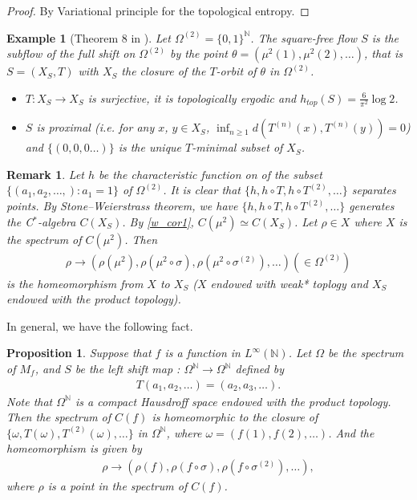 \documentclass[a4paper,10pt]{amsart}
\newtheorem{example}{Example}[section]
\newtheorem{proposition}{Proposition}[section]
\newtheorem{remark}{Remark}[section]
\newcommand{\N}{\mathbb N} %
\begin{document}
\begin{proof}
   By Variational principle for the topological entropy.
\end{proof}

\begin{example}[Theorem 8 in \cite{Sarnak}]
    Let $\Omega^{(2)} = \{0, 1\}^{\N}$. The square-free flow $S$ is the 
    subflow of the full shift on $\Omega^{(2)}$ by the point
    $\theta = (\mu^{2}(1), \mu^{2}(2), \ldots)$, that is 
    $S = (X_{S}, T)$ with $X_{S}$ the closure of the $T$-orbit of $\theta$
    in $\Omega^{(2)}$.
    \begin{itemize}
        \item $T: X_{S} \to X_{S}$ is surjective, it is topologically 
            ergodic and $h_{top}(S) = \frac{6}{\pi^2}\log 2$.
        \item $S$ is proximal (i.e. for any $x$, $y \in X_{S}$,
            $\inf_{n \geq 1} d(T^{(n)}(x), T^{(n)}(y)) = 0$) and 
            $\{(0,0,0 \ldots)\}$ is the unique $T$-minimal subset 
            of $X_{S}$.
    \end{itemize}
\end{example}

\begin{remark}
    Let $h$ be the characteristic function on of the subset 
    $\{(a_1, a_2, \ldots, ): a_1 = 1\}$ of $\Omega^{(2)}$.
    It is clear that $\{h, h \circ T, h \circ T^{(2)}, \ldots \}$
    separates points. By Stone–Weierstrass theorem, we have 
    $\{h, h \circ T, h \circ T^{(2)}, \ldots \}$ generates the 
    C$^*$-algebra $C(X_{S})$. By \cref{w_cor1}, $C(\mu^{2}) \simeq
    C(X_{S})$.
    Let $\rho \in X$ where $X$ is the spectrum of $C(\mu^{2})$. Then
    \begin{align*}
        \rho \to (\rho(\mu^2), \rho(\mu^2 \circ \sigma), 
        \rho(\mu^2 \circ \sigma^{(2)}), \ldots) (\in \Omega^{(2)}) 
    \end{align*}
    is the homeomorphism from $X$ to $X_{S}$ ($X$ endowed with
    weak* toplogy and $X_{S}$ endowed with the product topology).
\end{remark}

In general, we have the following fact.

\begin{proposition} \label{w_pro1}
    Suppose that $f$ is a function in $L^{\infty}(\N)$. 
    Let $\Omega$ be the spectrum of $M_{f}$, 
    and $S$ be the left shift map : $\Omega^{\N} \to \Omega^{\N}$ defined by
    \begin{align*}
        T(a_1, a_2, \ldots ) = (a_2, a_3, \ldots). 
    \end{align*}
    Note that $\Omega^{\N}$ is a compact Hausdroff space endowed with the 
    product topology.
    Then the spectrum of $C(f)$ is homeomorphic to the closure of 
    $\{\omega, T(\omega), T^{(2)}(\omega), \ldots \}$ in $\Omega^{\N}$, 
    where $\omega = (f(1), f(2), \ldots )$. And the homeomorphism is
    given by
    \begin{align*}
        \rho \to (\rho(f), \rho(f\circ \sigma), \rho(f \circ \sigma^{(2)}),
        \ldots),   
    \end{align*}
    where $\rho$ is a point in the spectrum of $C(f)$.
\end{proposition}
\end{document}
